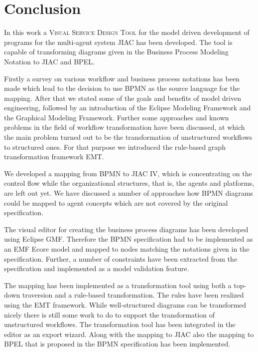 \chapter{Conclusion}
\label{chapter:conclusion}

In this work a \textsc{Visual Service Design Tool} for the model driven development of programs for the multi-agent system JIAC has been developed. The tool is capable of transforming diagrams given in the Business Process Modeling Notation to JIAC and BPEL.

Firstly a survey on various workflow and business process notations has been made which lead to the decision to use BPMN as the source language for the mapping. After that we stated some of the goals and benefits of model driven engineering, followed by an introduction of the Eclipse Modeling Framework and the Graphical Modeling Framework. Further some approaches and known problems in the field of workflow transformation have been discussed, at which the main problem turned out to be the transformation of unstructured workflows to structured ones. For that purpose we introduced the rule-based graph transformation framework EMT.

We developed a mapping from BPMN to JIAC IV, which is concentrating on the control flow while the organizational structures, that is, the agents and platforms, are left out yet. We have discussed a number of approaches how BPMN diagrams could be mapped to agent concepts which are not covered by the original specification.

The visual editor for creating the business process diagrams has been developed using Eclipse GMF. Therefore the BPMN specification had to be implemented as an EMF Ecore model and mapped to nodes matching the notations given in the specification. Further, a number of constraints have been extracted from the specification and implemented as a model validation feature.

The mapping has been implemented as a transformation tool using both a top-down traversion and a rule-based transformation. The rules have been realized using the EMT framework. While well-structured diagrams can be transformed nicely there is still some work to do to support the transformation of unstructured workflows. The transformation tool has been integrated in the editor as an export wizard. Along with the mapping to JIAC also the mapping to BPEL that is proposed in the BPMN specification has been implemented.



